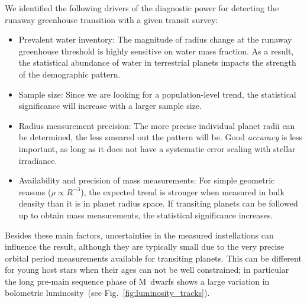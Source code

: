 \documentclass[modern]{aastex631}
\begin{document}
We identified the following drivers of the diagnostic power for detecting the runaway greenhouse transition with a given transit survey:
\begin{itemize}
    \item Prevalent water inventory: The magnitude of radius change at the runaway greenhouse threshold is highly sensitive on water mass fraction. As a result, the statistical abundance of water in terrestrial planets impacts the strength of the demographic pattern.
    \item Sample size: Since we are looking for a population-level trend, the statistical significance will increase with a larger sample size.
    \item Radius measurement precision: The more precise individual planet radii can be determined, the less smeared out the pattern will be. Good \textit{accuracy} is less important, as long as it does not have a systematic error scaling with stellar irradiance.
    \item Availability and precision of mass measurements: For simple geometric reasons ($\rho \propto R^{-3}$), the expected trend is stronger when measured in bulk density than it is in planet radius space. If transiting planets can be followed up to obtain mass measurements, the statistical significance increases.
\end{itemize}
Besides these main factors, uncertainties in the measured instellations can influence the result, although they are typically small due to the very precise orbital period measurements available for transiting planets.
This can be different for young host stars when their ages can not be well constrained; in particular the long pre-main sequence phase of M~dwarfs shows a large variation in bolometric luminosity~(see Fig.~\ref{fig:luminosity_tracks}).
\end{document}

